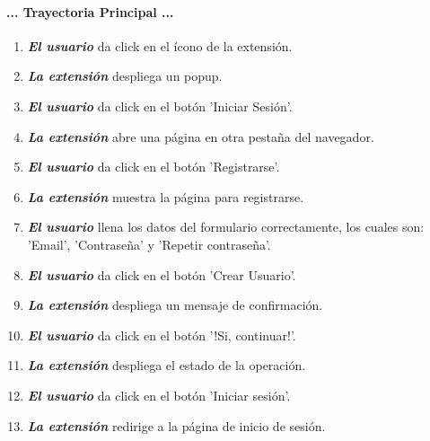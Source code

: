 \documentclass[12pt, a4paper, titlepage]{report}
\begin{document}
				\paragraph{... Trayectoria Principal ...}
				\begin{enumerate}
				    
				    \item \textbf{\textit{El usuario}} da click en el ícono de la extensión.
				    
				    \item \textbf{\textit{La extensión}} despliega un popup.
					
					\item \textbf{\textit{El usuario}} da click en el botón 'Iniciar Sesión'.
					
					\item \textbf{\textit{La extensión}} abre una página en otra pestaña del navegador.
					
					\item \textbf{\textit{El usuario}} da click en el botón 'Registrarse'.
					
					\item \textbf{\textit{La extensión}} muestra la página para registrarse.
					
					\item \textbf{\textit{El usuario}} llena los datos del formulario correctamente, los cuales son: 'Email', 'Contraseña' y 'Repetir contraseña'.
					
					\item \textbf{\textit{El usuario}} da click en el botón 'Crear Usuario'.
					
					\item \textbf{\textit{La extensión}} despliega un mensaje de confirmación.
					
					\item \textbf{\textit{El usuario}} da click en el botón '!Si, continuar!'.
					
			        \item \textbf{\textit{La extensión}} despliega el estado de la operación.
			        
			        \item \textbf{\textit{El usuario}} da click en el botón 'Iniciar sesión'.
			        
			        \item \textbf{\textit{La extensión}} redirige a la página de inicio de sesión.
					
				\end{enumerate}
\end{document}
